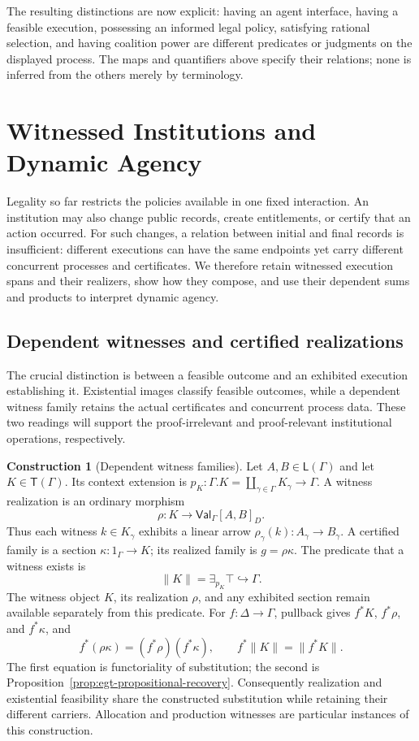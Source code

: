\documentclass[11pt,a4paper]{article}
\numberwithin{equation}{section}
\theoremstyle{definition}
\newtheorem{construction}[construction]{Construction}
\theoremstyle{remark}
\theoremstyle{plain}
\begin{document}
The resulting distinctions are now explicit: having an agent
interface, having a feasible execution, possessing an informed legal
policy, satisfying rational selection, and having coalition power are
different predicates or judgments on the displayed process. The maps and
quantifiers above specify their relations; none is inferred from the
others merely by terminology.

\section{Witnessed Institutions and Dynamic Agency}\label{sec:paper-8}

Legality so far restricts the policies available in one fixed
interaction. An institution may also change public records, create
entitlements, or certify that an action occurred. For such changes,
a relation between initial and final records is insufficient: different
executions can have the same endpoints yet carry different concurrent
processes and certificates. We therefore retain witnessed execution spans
and their realizers, show how they compose, and use their dependent sums
and products to interpret dynamic agency.

\subsection{Dependent witnesses and certified realizations}
\label{sec:egt-witnesses}

The crucial distinction is between a feasible outcome and an
exhibited execution establishing it. Existential images classify feasible
outcomes, while a dependent witness family retains the actual
certificates and concurrent process data. These two readings will
support the proof-irrelevant and proof-relevant institutional operations,
respectively.

\begin{construction}[Dependent witness families]
\label{con:egt-general-witness-family}
Let $A,B\in\mathsf L(\Gamma)$ and let $K\in\mathsf T(\Gamma)$.
Its context extension is
$p_K:\Gamma.K=\coprod_{\gamma\in\Gamma}K_\gamma\to\Gamma$.
A witness realization is an ordinary morphism
\[
 \rho:K\longrightarrow\mathsf{Val}_\Gamma[A,B]_D.
\]
Thus each witness $k\in K_\gamma$ exhibits a linear arrow
$\rho_\gamma(k):A_\gamma\to B_\gamma$.
A certified family is a section $\kappa:1_\Gamma\to K$; its realized
family is $g=\rho\kappa$. The predicate that a witness exists is
\[
 \|K\|=\exists_{p_K}\top\hookrightarrow\Gamma.
\]
The witness object $K$, its realization $\rho$, and any exhibited section
remain available separately from this predicate. For $f:\Delta\to\Gamma$,
pullback gives $f^*K$, $f^*\rho$, and $f^*\kappa$, and
\[
 f^*(\rho\kappa)=(f^*\rho)(f^*\kappa),\qquad
 f^*\|K\|=\|f^*K\|.
\]
The first equation is functoriality of substitution; the second is
Proposition~\ref{prop:egt-propositional-recovery}. Consequently realization
and existential feasibility share the constructed substitution while
retaining their different carriers. Allocation and production witnesses are particular instances of
this construction.
\end{construction}
\end{document}
